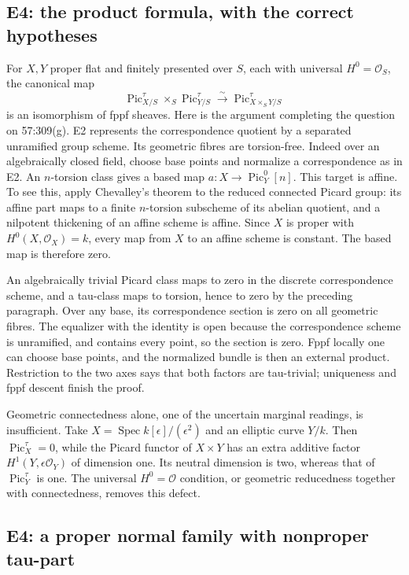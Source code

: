 \subsection{E4: the product formula, with the correct hypotheses}

For $X,Y$ proper flat and finitely presented over $S$, each with universal
$H^0=\mathcal O_S$, the canonical map
\[
 \operatorname{Pic}^\tau_{X/S}\times_S\operatorname{Pic}^\tau_{Y/S}
 \xrightarrow{\sim}\operatorname{Pic}^\tau_{X\times_SY/S}
\]
is an isomorphism of fppf sheaves. Here is the argument completing the
question on 57:309(g). E2 represents the correspondence quotient by a
separated unramified group scheme. Its geometric fibres are torsion-free.
Indeed over an algebraically closed field, choose base points and normalize
a correspondence as in E2. An $n$-torsion class gives a based map
$a:X\to\operatorname{Pic}^0_Y[n]$. This target is affine. To see this, apply
Chevalley's theorem to the reduced connected Picard group: its affine part
maps to a finite $n$-torsion subscheme of its abelian quotient, and a nilpotent
thickening of an affine scheme is affine. Since $X$ is proper with
$H^0(X,\mathcal O_X)=k$, every map from $X$ to an affine scheme is constant.
The based map is therefore zero.

An algebraically trivial Picard class maps to zero in the discrete
correspondence scheme, and a tau-class maps to torsion, hence to zero by
the preceding paragraph. Over any base, its correspondence section is zero
on all geometric fibres. The equalizer with the identity is open because
the correspondence scheme is unramified, and contains every point, so the
section is zero. Fppf locally one can choose base points, and the normalized
bundle is then an external product. Restriction to the two axes says that
both factors are tau-trivial; uniqueness and fppf descent finish the proof.

Geometric connectedness alone, one of the uncertain marginal readings, is
insufficient. Take $X=\operatorname{Spec}k[\epsilon]/(\epsilon^2)$ and an
elliptic curve $Y/k$. Then $\operatorname{Pic}^\tau_X=0$, while the Picard
functor of $X\times Y$ has an extra additive factor $H^1(Y,\epsilon\mathcal O_Y)$
of dimension one. Its neutral dimension is two, whereas that of
$\operatorname{Pic}^\tau_Y$ is one. The universal $H^0=\mathcal O$ condition,
or geometric reducedness together with connectedness, removes this defect.

\subsection{E4: a proper normal family with nonproper tau-part}


